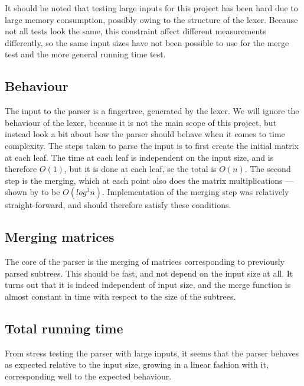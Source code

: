 \documentclass[a4paper,12pt,twosided]{report}
\begin{document}
It should be noted that testing large inputs for this project has been hard due
to large memory consumption, possibly owing to the structure of the lexer.
Because not all tests look the same, this constraint affect different
measurements differently, so the same input sizes have not been possible to use
for the merge test and the more general running time test.

\subsection{Behaviour}
The input to the parser is a fingertree, generated by the lexer. We will ignore
the behaviour of the lexer, because it is not the main scope of this project, but
instead look a bit about how the parser should behave when it comes to time
complexity. The steps taken to parse the input is to first create the initial
matrix at each leaf. The time at each leaf is independent on the input size, and
is therefore $O(1)$, but it is done at each leaf, se the total is $O(n)$. The
second step is the merging, which at each point also does the matrix
multiplications --- shown by \citet{parparsepaper} to be $O(log^3 n)$.
Implementation of the merging step was relatively straight-forward, and should
therefore satisfy these conditions. 

\subsection{Merging matrices}
The core of the parser is the merging of matrices corresponding to previously
parsed subtrees. This should be fast, and not depend on the input size at all.
It turns out that it is indeed independent of input size, and the merge function
is almost constant in time with respect to the size of the subtrees.

\subsection{Total running time}
From stress testing the parser with large inputs, it seems that the parser
behaves as expected relative to the input size, growing in a linear fashion with
it, corresponding well to the expected behaviour.
\end{document}
